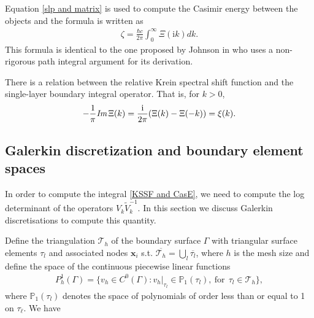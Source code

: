 Equation \eqref{slp and matrix} is used to compute the Casimir energy between the objects and the formula is written as
\begin{align}\label{KSSF and CasE}
    \zeta = \frac{\hbar c}{2\pi}\int_{0}^{\infty}\Xi(\mathrm{i}k)dk.
\end{align}
This formula is identical to the one proposed by Johnson in \cite{reid2009efficient} who uses a non-rigorous path integral argument for its derivation.

\begin{remark}
    There is a relation between the relative Krein spectral shift function and the single-layer boundary integral operator. That is,
    for $k > 0$, 
    \begin{align*}
        -\frac{1}{\pi}\emph{\text{Im}}\,\Xi(k) = \frac{\mathrm{i}}{2\pi}(\Xi(k) - \Xi(-k)) = \xi(k).
    \end{align*}
\end{remark}



\subsection{Galerkin discretization and boundary element spaces}
In order to compute the integral \eqref{KSSF and CasE}, we need to compute the log determinant of the operators $V_{k}\tilde{V}_{k}^{-1}$. In this section we discuss Galerkin discretisations to compute this quantity.

Define the 
triangulation $\mathcal{T}_{h}$ of the boundary surface $\Gamma$ with triangular surface elements $\tau_{l}$ and associated nodes $\boldsymbol{x}_{i}$ 
s.t. $\overline{\mathcal{T}_{h}} = \bigcup_{l}\overline{\tau_{l}}$, where $h$ is the mesh size and define the space of the continuous piecewise linear functions
\begin{align*}
    P_{h}^{1}(\Gamma) = \{v_{h}\in C^{0}(\Gamma): v_{h}|_{\tau_{l}}\in\mathbb{P}_{1}(\tau_{l}), \ \text{for} \ \ \tau_{l}\in\mathcal{T}_{h}\},
\end{align*}
where $\mathbb{P}_{1}(\tau_{l})$ denotes the space of polynomials of order less than or equal to 1 on $\tau_{\ell}$. We have

